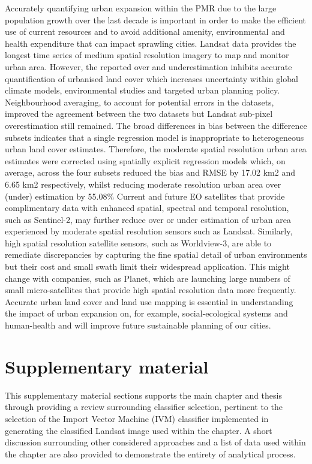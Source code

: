 \documentclass[]{book}
\begin{document}
Accurately quantifying urban expansion within the PMR due to the large
population growth over the last decade is important in order to make the
efficient use of current resources and to avoid additional amenity,
environmental and health expenditure that can impact sprawling cities.
Landsat data provides the longest time series of medium spatial
resolution imagery to map and monitor urban area. However, the reported
over and underestimation inhibits accurate quantification of urbanised
land cover which increases uncertainty within global climate models,
environmental studies and targeted urban planning policy. Neighbourhood
averaging, to account for potential errors in the datasets, improved the
agreement between the two datasets but Landsat sub-pixel overestimation
still remained. The broad differences in bias between the difference
subsets indicates that a single regression model is inappropriate to
heterogeneous urban land cover estimates. Therefore, the moderate
spatial resolution urban area estimates were corrected using spatially
explicit regression models which, on average, across the four subsets
reduced the bias and RMSE by 17.02 km2 and 6.65 km2 respectively, whilst
reducing moderate resolution urban area over (under) estimation by
55.08\% Current and future EO satellites that provide complimentary data
with enhanced spatial, spectral and temporal resolution, such as
Sentinel-2, may further reduce over or under estimation of urban area
experienced by moderate spatial resolution sensors such as Landsat.
Similarly, high spatial resolution satellite sensors, such as
Worldview-3, are able to remediate discrepancies by capturing the fine
spatial detail of urban environments but their cost and small swath
limit their widespread application. This might change with companies,
such as Planet, which are launching large numbers of small
micro-satellites that provide high spatial resolution data more
frequently. Accurate urban land cover and land use mapping is essential
in understanding the impact of urban expansion on, for example,
social-ecological systems and human-health and will improve future
sustainable planning of our cities.

\section{Supplementary material}\label{supplementary-material-1}

This supplementary material sections supports the main chapter and
thesis through providing a review surrounding classifier selection,
pertinent to the selection of the Import Vector Machine (IVM) classifier
implemented in generating the classified Landsat image used within the
chapter. A short discussion surrounding other considered approaches and
a list of data used within the chapter are also provided to demonstrate
the entirety of analytical process.
\end{document}

